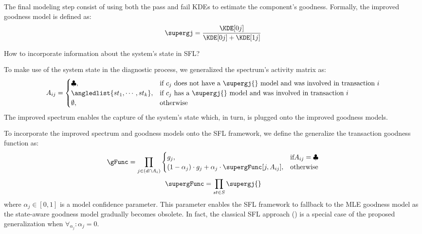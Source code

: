 The final modeling step consist of using both the pass and fail \acp{KDE}
to estimate the component's goodness.
%
Formally, the improved goodness model is defined as:
\begin{equation}
  \supergj = \frac{\KDE[0j]}{\KDE[0j] + \KDE[1j]}
\end{equation}


\begin{description}[leftmargin=!,labelwidth=\widthof{\bfseries \Cref{rq:optimizations} ---}]
\item [\Cref{rq:system-state} ---] How to incorporate information
  about the system's state in \ac{SFL}?
\end{description}

To make use of the system state in the diagnostic process, we
generalized the spectrum's activity matrix as:
\begin{equation}
  A_{ij} = \begin{cases}
    \clubsuit, & \textrm{if $c_j$ does not have a $\supergj{}$ model and was involved in transaction $i$} \\
    \angledlist{st_{1}, \cdots, st_{k}}, & \textrm{if $c_j$ has a $\supergj{}$ model and was involved in transaction $i$}\\
    \emptyset, & \textrm{otherwise}
  \end{cases}
\end{equation}
\noindent
The improved spectrum enables the capture of the system's state which,
in turn, is plugged onto the improved goodness models.
%

To incorporate the improved spectrum and goodness models onto the
\ac{SFL} framework, we define the generalize the transaction goodness
function as:
\begin{equation}
  \displaystyle \gFunc = \prod_{j \in (d \cap A_i)}
  \begin{cases}
    g_j, & \textrm{if} A_{ij} = \clubsuit\\
    (1-\alpha_j) \cdot g_j + \alpha_j \cdot \supergFunc[j,A_{ij}], & \textrm{otherwise}
  \end{cases}
\end{equation}
\begin{equation}
  \supergFunc = \prod_{st \in S} \supergj{}
\end{equation}
\noindent
where $\alpha_j \in [0,1]$ is a model confidence parameter.
%
This parameter enables the \ac{SFL} framework to fallback to the
\ac{MLE} goodness model as the state-aware goodness model gradually
becomes obsolete.
%
In fact, the classical \ac{SFL} approach
() is a special case of the proposed
generalization when $\forall_{\alpha_j} : \alpha_j = 0$.


